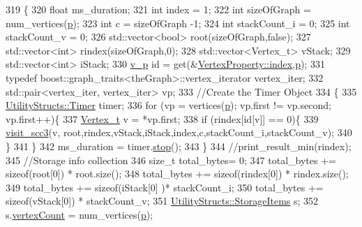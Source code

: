 \begin{DoxyCode}
319                                                  \{
320     \textcolor{keywordtype}{float} ms\_duration;
321     \textcolor{keywordtype}{int} index = 1;
322     \textcolor{keywordtype}{int} sizeOfGraph = num\_vertices(\hyperlink{class_pearce_a2320928312fd97f6bcb1f16684f79a03}{p});
323     \textcolor{keywordtype}{int} c = sizeOfGraph -1;
324     \textcolor{keywordtype}{int} stackCount\_i = 0;
325     \textcolor{keywordtype}{int} stackCount\_v = 0;
326     std::vector<bool> root(sizeOfGraph,\textcolor{keyword}{false});
327     std::vector<int> rindex(sizeOfGraph,0);
328     std::vector<Vertex\_t> vStack;
329     std::vector<int> iStack;
330     \hyperlink{utilities_8h_a3f4959b3d837fa6351a9414c79280286}{v\_p} \textcolor{keywordtype}{id} = \textcolor{keyword}{get}(&\hyperlink{struct_utility_structs_1_1_vertex_property_a636cb729438e999aa3d9a17ac39d8641}{VertexProperty::index},\hyperlink{class_pearce_a2320928312fd97f6bcb1f16684f79a03}{p});
331     \textcolor{keyword}{typedef} boost::graph\_traits<theGraph>::vertex\_iterator vertex\_iter;
332     std::pair<vertex\_iter, vertex\_iter> vp;
333     \textcolor{comment}{//Create the Timer Object }
334     \{
335         \hyperlink{class_utility_structs_1_1_timer}{UtilityStructs::Timer} timer;
336         \textcolor{keywordflow}{for} (vp = vertices(\hyperlink{class_pearce_a2320928312fd97f6bcb1f16684f79a03}{p}); vp.first != vp.second; vp.first++)\{
337         \hyperlink{utilities_8h_a344cd987714d06997f0becda3c96d6e2}{Vertex\_t} v = *vp.first;
338         \textcolor{keywordflow}{if} (rindex[\textcolor{keywordtype}{id}[v]] == 0)\{
339             \hyperlink{class_pearce_a70800d4564b36fb64762d3a78f1f67d8}{visit\_scc3}(v, root,rindex,vStack,iStack,index,c,stackCount\_i,stackCount\_v);
340         \}
341     \}
342         ms\_duration = timer.\hyperlink{class_utility_structs_1_1_timer_a12f62b57c263d563efd6089cff52355f}{stop}();
343     \}
344     \textcolor{comment}{//print\_result\_min(rindex);  }
345     \textcolor{comment}{//Storage info collection}
346     \textcolor{keywordtype}{size\_t} total\_bytes= 0;
347     total\_bytes += \textcolor{keyword}{sizeof}(root[0]) * root.size();
348     total\_bytes += \textcolor{keyword}{sizeof}(rindex[0]) * rindex.size();
349     total\_bytes += \textcolor{keyword}{sizeof}(iStack[0] )* stackCount\_i;
350     total\_bytes += \textcolor{keyword}{sizeof}(vStack[0]) * stackCount\_v;
351     \hyperlink{struct_utility_structs_1_1_storage_items}{UtilityStructs::StorageItems} s;
352     s.\hyperlink{struct_utility_structs_1_1_storage_items_af72522be713f23fcfe3ac66780183fda}{vertexCount} = num\_vertices(\hyperlink{class_pearce_a2320928312fd97f6bcb1f16684f79a03}{p});

\end{DoxyCode}
